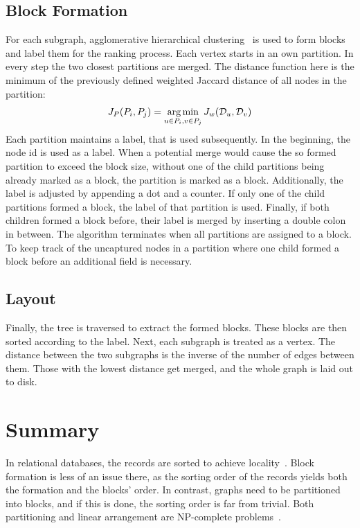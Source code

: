     \subsection*{Block Formation}
    For each subgraph, agglomerative hierarchical clustering~\autocite{hac} is used to form blocks and label them for the ranking process.
    Each vertex starts in an own partition. 
    In every step the two closest partitions are merged. 
    The distance function here is the minimum of the previously defined weighted Jaccard distance of all nodes in the partition:
    \[ J_P (P_i, P_j) = \operatorname*{arg\,min}_{u \in P_i, v \in P_j} J_w (\mathcal{D}_u, \mathcal{D}_v) \]
    Each partition maintains a label, that is used subsequently.
    In the beginning, the node id is used as a label. 
    When a potential merge would cause the so formed partition to exceed the block size, without one of the child partitions being already marked as a block, the partition is marked as a block.
    Additionally, the label is adjusted by appending a dot and a counter.
    If only one of the child partitions formed a block, the label of that partition is used.
    Finally, if both children formed a block before, their label is merged by inserting a double colon in between.
    The algorithm terminates when all partitions are assigned to a block.
    To keep track of the uncaptured nodes in a partition where one child formed a block before an additional field is necessary.    
    
    
    \subsection*{Layout}
    Finally, the tree is traversed to extract the formed blocks.
	These blocks are then sorted according to the label. 
    Next, each subgraph is treated as a vertex.
The distance between the two subgraphs is the inverse of the number of edges between them. Those with the lowest distance get merged, and the whole graph is laid out to disk.
    


\section*{Summary}
    In relational databases, the records are sorted to achieve locality~\autocite{ramakrishnan2000database, silberschatz1997database}. 
    Block formation is less of an issue there, as the sorting order of the records yields both the formation and the blocks' order.
    In contrast, graphs need to be partitioned into blocks, and if this is done, the sorting order is far from trivial.
    Both partitioning and linear arrangement are NP-complete problems~\autocite{lewis1983computers}.
    
